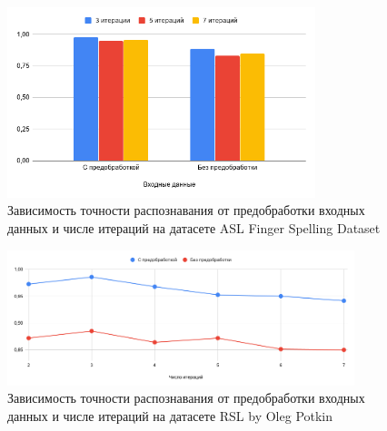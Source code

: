 \begin{figure}
	\centering
	\includegraphics[width=0.8\textwidth]{inc/img/asl}
	\caption{Зависимость точности распознавания от предобработки входных данных и числе итераций на датасете ASL Finger Spelling Dataset}
	\label{res:asl}
\end{figure}


\begin{figure}
	\centering
	\includegraphics[width=0.9\textwidth]{inc/img/rsl_oleg}
	\caption{Зависимость точности распознавания от предобработки входных данных и числе итераций на датасете RSL by Oleg Potkin}
	\label{res:rsl_oleg}
\end{figure}

